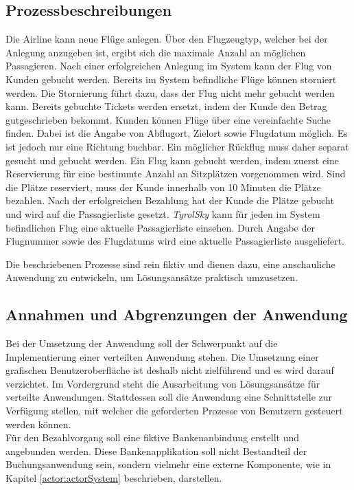 \subsection{Prozessbeschreibungen}
\begin{enumerate}
     Die Airline kann neue Flüge anlegen. Über den Flugzeugtyp, welcher bei der Anlegung anzugeben ist, ergibt sich die maximale Anzahl an möglichen Passagieren. Nach einer erfolgreichen Anlegung im System kann der Flug von Kunden gebucht werden.
     Bereits im System befindliche Flüge können storniert werden. Die Stornierung führt dazu, dass der Flug nicht mehr gebucht werden kann. Bereits gebuchte Tickets werden  ersetzt, indem der Kunde den Betrag gutgeschrieben bekommt.
    Kunden können Flüge über eine vereinfachte Suche finden. Dabei ist die Angabe von Abflugort, Zielort sowie Flugdatum möglich. Es ist jedoch nur  eine Richtung buchbar. Ein möglicher Rückflug muss daher separat gesucht und gebucht werden. 
    Ein Flug kann gebucht werden, indem zuerst eine Reservierung für eine bestimmte Anzahl an Sitzplätzen vorgenommen wird. Sind die Plätze reserviert, muss der Kunde innerhalb von 10 Minuten die Plätze bezahlen. Nach der erfolgreichen Bezahlung hat der Kunde die Plätze gebucht und wird auf die Passagierliste gesetzt. 
    \textit{TyrolSky} kann für jeden im System befindlichen Flug eine aktuelle Passagierliste einsehen. Durch Angabe der Flugnummer sowie des Flugdatums wird eine aktuelle Passagierliste ausgeliefert.
\end{enumerate}
Die beschriebenen Prozesse sind rein fiktiv und dienen dazu, eine anschauliche Anwendung zu entwickeln, um Lösungsansätze praktisch umzusetzen. 

\subsection{Annahmen und Abgrenzungen der Anwendung}
Bei der Umsetzung der Anwendung soll der Schwerpunkt auf die Implementierung einer verteilten Anwendung stehen. Die Umsetzung einer grafischen Benutzeroberfläche ist deshalb nicht zielführend und es wird darauf verzichtet. Im Vordergrund steht die Ausarbeitung von Lösungsansätze für verteilte Anwendungen. Stattdessen soll die Anwendung eine Schnittstelle zur Verfügung stellen, mit welcher die geforderten Prozesse von Benutzern gesteuert werden können. \\
% 
% 
% 
Für den Bezahlvorgang soll eine fiktive Bankenanbindung erstellt und angebunden werden. Diese Bankenapplikation soll nicht Bestandteil der Buchungsanwendung sein, sondern vielmehr eine externe Komponente, wie in Kapitel \ref{actor:actorSystem} beschrieben, darstellen. 

